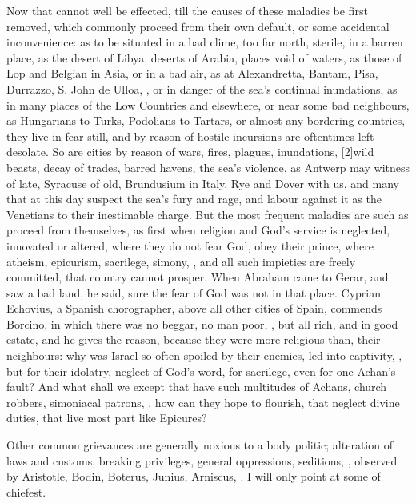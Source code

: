 Now that cannot well be effected, till the causes of these maladies be
first removed, which commonly proceed from their own default, or some
accidental inconvenience: as to be situated in a bad clime, too far
north, sterile, in a barren place, as the desert of Libya, deserts of
Arabia, places void of waters, as those of Lop and Belgian in Asia, or
in a bad air, as at Alexandretta, Bantam, Pisa, Durrazzo, S. John de
Ulloa, \etc{}, or in danger of the sea's continual inundations, as in many
places of the Low Countries and elsewhere, or near some bad neighbours,
as Hungarians to Turks, Podolians to Tartars, or almost any bordering
countries, they live in fear still, and by reason of hostile incursions
are oftentimes left desolate. So are cities by reason of wars,
fires, plagues, inundations, [2\baselineskip]wild beasts, decay of trades, barred
havens, the sea's violence, as Antwerp may witness of late, Syracuse of
old, Brundusium in Italy, Rye and Dover with us, and many that at this
day suspect the sea's fury and rage, and labour against it as the
Venetians to their inestimable charge. But the most frequent maladies
are such as proceed from themselves, as first when religion and God's
service is neglected, innovated or altered, where they do not fear God,
obey their prince, where atheism, epicurism, sacrilege, simony, \etc{},
and all such impieties are freely committed, that country cannot
prosper. When Abraham came to Gerar, and saw a bad land, he said, sure
the fear of God was not in that place.  Cyprian Echovius, a
Spanish chorographer, above all other cities of Spain, commends
Borcino, in which there was no beggar, no man poor, \etc{}, but all rich,
and in good estate, and he gives the reason, because they were more
religious than, their neighbours: why was Israel so often spoiled by
their enemies, led into captivity, \etc{}, but for their idolatry, neglect
of God's word, for sacrilege, even for one Achan's fault? And what
shall we except that have such multitudes of Achans, church robbers,
simoniacal patrons, \etc{}, how can they hope to flourish, that neglect
divine duties, that live most part like Epicures?

Other common grievances are generally noxious to a body politic;
alteration of laws and customs, breaking privileges, general
oppressions, seditions, \etc{}, observed by Aristotle, Bodin,
Boterus, Junius, Arniscus, \etc{}. I will only point at some of chiefest.

